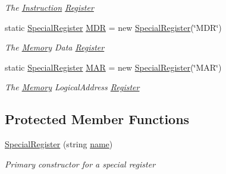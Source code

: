 \begin{DoxyCompactItemize}
\begin{DoxyCompactList}\small\item\em The \hyperlink{class_c_p_u___o_s___simulator_1_1_c_p_u_1_1_instruction}{Instruction} \hyperlink{class_c_p_u___o_s___simulator_1_1_c_p_u_1_1_register}{Register} \end{DoxyCompactList}\item 
static \hyperlink{class_c_p_u___o_s___simulator_1_1_c_p_u_1_1_special_register}{Special\+Register} \hyperlink{class_c_p_u___o_s___simulator_1_1_c_p_u_1_1_special_register_aabf7c761e1f8a9994b7c0b131c53924d}{M\+D\+R} = new \hyperlink{class_c_p_u___o_s___simulator_1_1_c_p_u_1_1_special_register}{Special\+Register}(\char`\"{}M\+D\+R\char`\"{})
\begin{DoxyCompactList}\small\item\em The \hyperlink{namespace_c_p_u___o_s___simulator_1_1_memory}{Memory} Data \hyperlink{class_c_p_u___o_s___simulator_1_1_c_p_u_1_1_register}{Register} \end{DoxyCompactList}\item 
static \hyperlink{class_c_p_u___o_s___simulator_1_1_c_p_u_1_1_special_register}{Special\+Register} \hyperlink{class_c_p_u___o_s___simulator_1_1_c_p_u_1_1_special_register_a2ae89cee8b74f9985f43ee4e6f994bad}{M\+A\+R} = new \hyperlink{class_c_p_u___o_s___simulator_1_1_c_p_u_1_1_special_register}{Special\+Register}(\char`\"{}M\+A\+R\char`\"{})
\begin{DoxyCompactList}\small\item\em The \hyperlink{namespace_c_p_u___o_s___simulator_1_1_memory}{Memory} Logical\+Address \hyperlink{class_c_p_u___o_s___simulator_1_1_c_p_u_1_1_register}{Register} \end{DoxyCompactList}\end{DoxyCompactItemize}
\subsection*{Protected Member Functions}
\begin{DoxyCompactItemize}
\item 
\hyperlink{class_c_p_u___o_s___simulator_1_1_c_p_u_1_1_special_register_a0328b3388027aa409a68191685753f4a}{Special\+Register} (string \hyperlink{class_c_p_u___o_s___simulator_1_1_c_p_u_1_1_special_register_ac521aef66f5fe6a88486e70f5ade8326}{name})
\begin{DoxyCompactList}\small\item\em Primary constructor for a special register \end{DoxyCompactList}\end{DoxyCompactItemize}

